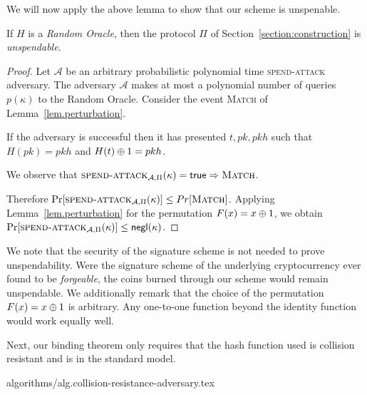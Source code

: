 We will now apply the above lemma to show that our scheme is unspenable.

\begin{theorem}[Unspendability]
  If $H$ is a \emph{Random Oracle}, then the protocol $\Pi$ of Section~\ref{section:construction} is \emph{unspendable}.
\end{theorem}
\begin{proof}
  Let $\mathcal{A}$ be an arbitrary probabilistic polynomial time \textsc{spend-attack} adversary.
  The adversary $\mathcal{A}$ makes at most a polynomial number of queries $p(\kappa)$ to the Random Oracle.
  Consider the event \textsc{Match} of Lemma~\ref{lem.perturbation}.

  If the adversary is successful then it has presented $t, pk, pkh$ such that $H(pk) = pkh$ and $H(t) \oplus 1 = pkh$.

  We observe that $\textsc{spend-attack}_{\mathcal{A}, \Pi}(\kappa) = \mathsf{true} \Rightarrow \textsc{Match}$.

  Therefore $\Pr[\textsc{spend-attack}_{\mathcal{A}, \Pi}(\kappa)] \leq Pr[\textsc{Match}]$. Applying Lemma~\ref{lem.perturbation} for the permutation $F(x) = x \oplus 1$,
  we obtain
  $\Pr[\textsc{spend-attack}_{\mathcal{A}, \Pi}(\kappa)] \leq \textsf{negl}(\kappa)$.
\end{proof}

We note that the security of the signature scheme is not needed to prove unspendability. Were the signature scheme of the underlying cryptocurrency ever found to be \emph{forgeable}, the coins burned through our scheme would remain unspendable. We additionally remark that the
choice of the permutation $F(x) = x \oplus 1$ is arbitrary. Any one-to-one
function beyond the identity function would work equally well.

Next, our binding theorem only requires that the hash function used is collision
resistant and is in the standard model.

{algorithms/alg.collision-resistance-adversary.tex}

